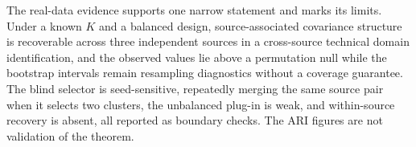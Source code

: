 The real-data evidence supports one narrow statement and marks its
limits. Under a known \(K\) and a balanced design, source-associated
covariance structure is recoverable across three independent sources in
a cross-source technical domain identification, and the observed values
lie above a permutation null while the bootstrap intervals remain
resampling diagnostics without a coverage guarantee. The blind selector
is seed-sensitive, repeatedly merging the same source pair when it
selects two clusters, the unbalanced plug-in is weak, and within-source
recovery is absent, all reported as boundary checks. The ARI figures are
not validation of the theorem.
